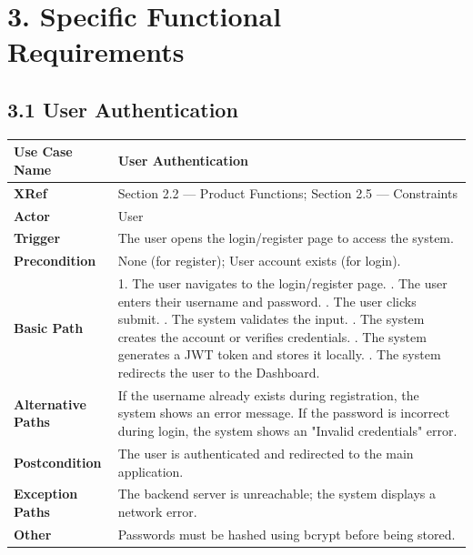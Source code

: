 \documentclass[12pt]{article}
\begin{document}
\section*{3. Specific Functional Requirements}

\subsection*{3.1 User Authentication}

\renewcommand{\arraystretch}{1.5}
\begin{xltabular}{\textwidth}{|p{4cm}|X|}
\hline
\textbf{Use Case Name} & \textbf{User Authentication} \\ \hline
\textbf{XRef} & Section 2.2 — Product Functions; Section 2.5 — Constraints \\ \hline
\textbf{Actor} & User \\ \hline
\textbf{Trigger} & The user opens the login/register page to access the system. \\ \hline
\textbf{Precondition} & None (for register); User account exists (for login). \\ \hline
\textbf{Basic Path} & 1. The user navigates to the login/register page. . The user enters their username and password. . The user clicks submit. . The system validates the input. . The system creates the account or verifies credentials. . The system generates a JWT token and stores it locally. . The system redirects the user to the Dashboard. \\ \hline
\textbf{Alternative Paths} & If the username already exists during registration, the system shows an error message. If the password is incorrect during login, the system shows an "Invalid credentials" error. \\ \hline
\textbf{Postcondition} & The user is authenticated and redirected to the main application. \\ \hline
\textbf{Exception Paths} & The backend server is unreachable; the system displays a network error. \\ \hline
\textbf{Other} & Passwords must be hashed using bcrypt before being stored. \\ \hline
\end{xltabular}
\end{document}
